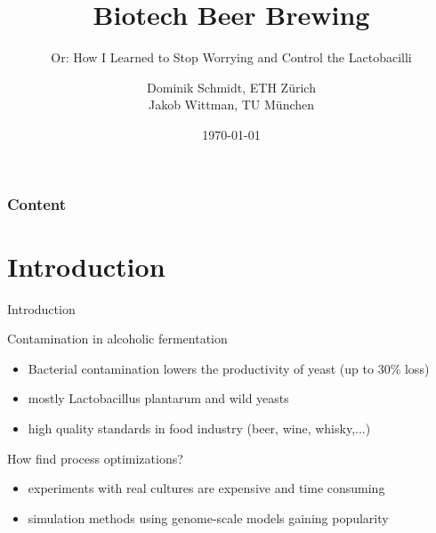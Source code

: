 \documentclass{beamer}
\title{Biotech Beer Brewing}
\subtitle{Or: How I Learned to Stop Worrying and Control the Lactobacilli}
\author{Dominik Schmidt, ETH Zürich\\Jakob Wittman, TU München}
\institute{Háskóli Íslands}
\date{\today}
\begin{document}
\begin{frame}[plain]
	\titlepage
\end{frame}
\begin{frame}
  \frametitle{Content}
  \tableofcontents
\end{frame}

\section{Introduction}
\begin{frame}{Introduction}
  \begin{block}{Contamination in alcoholic fermentation}
    \begin{itemize}
      \item Bacterial contamination lowers the productivity of yeast (up to 30\% loss)
      \item mostly Lactobacillus plantarum and wild yeasts
      \item high quality standards in food industry (beer, wine, whisky,...)
    \end{itemize}
  \end{block}

  \begin{block}{How find process optimizations?}
    \begin{itemize}
     \item experiments with real cultures are expensive and time consuming
     \item simulation methods using genome-scale models gaining popularity
    \end{itemize}
  \end{block}
\end{frame}
\end{document}
